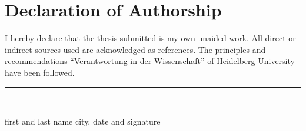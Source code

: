 \section*{Declaration of Authorship}

I hereby declare that the thesis submitted is my own unaided work. All direct or indirect sources used are acknowledged as references. The principles and recommendations \enquote{Verantwortung in der Wissenschaft} of Heidelberg University have been followed.
\vspace{5cm}\\
\noindent\rule[0.5ex]{8em}{0.5pt} \hfill \rule[0.5ex]{10em}{0.5pt}\\
\noindent first and last name \hfill city, date and signature